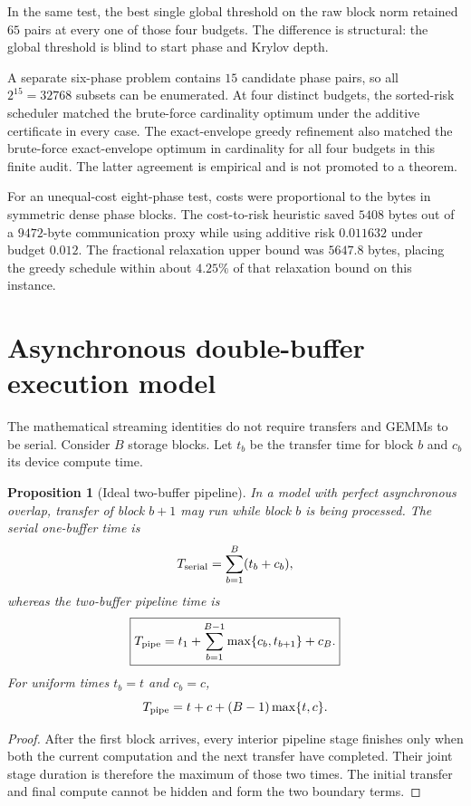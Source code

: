 \documentclass[11pt]{article}
\newtheorem{proposition}[theorem]{Proposition}
\theoremstyle{definition}
\theoremstyle{remark}
\begin{document}
In the same test, the best single global threshold on the raw block norm
retained $65$ pairs at every one of those four budgets.  The difference is
structural: the global threshold is blind to start phase and Krylov depth.

A separate six-phase problem contains $15$ candidate phase pairs, so all
$2^{15}=32768$ subsets can be enumerated.  At four distinct budgets, the
sorted-risk scheduler matched the brute-force cardinality optimum under the
additive certificate in every case.  The exact-envelope greedy refinement also
matched the brute-force exact-envelope optimum in cardinality for all four
budgets in this finite audit.  The latter agreement is empirical and is not
promoted to a theorem.

For an unequal-cost eight-phase test, costs were proportional to the bytes in
symmetric dense phase blocks.  The cost-to-risk heuristic saved $5408$ bytes
out of a $9472$-byte communication proxy while using additive risk $0.011632$
under budget $0.012$.  The fractional relaxation upper bound was $5647.8$
bytes, placing the greedy schedule within about $4.25\%$ of that relaxation
bound on this instance.

\section{Asynchronous double-buffer execution model}
\label{sec:double-buffer}

The mathematical streaming identities do not require transfers and GEMMs to be
serial.  Consider $B$ storage blocks.  Let $t_b$ be the transfer time for block
$b$ and $c_b$ its device compute time.

\begin{proposition}[Ideal two-buffer pipeline]
In a model with perfect asynchronous overlap, transfer of block $b+1$ may run
while block $b$ is being processed.  The serial one-buffer time is
\[
T_{\rm serial}=\sum_{b=1}^{B}(t_b+c_b),
\]
whereas the two-buffer pipeline time is
\[
\boxed{
T_{\rm pipe}
=
t_1
+
\sum_{b=1}^{B-1}\max\{c_b,t_{b+1}\}
+
c_B.
}
\]
For uniform times $t_b=t$ and $c_b=c$,
\[
T_{\rm pipe}=t+c+(B-1)\max\{t,c\}.
\]
\end{proposition}

\begin{proof}
After the first block arrives, every interior pipeline stage finishes only when
both the current computation and the next transfer have completed.  Their
joint stage duration is therefore the maximum of those two times.  The initial
transfer and final compute cannot be hidden and form the two boundary terms.
\end{proof}
\end{document}
